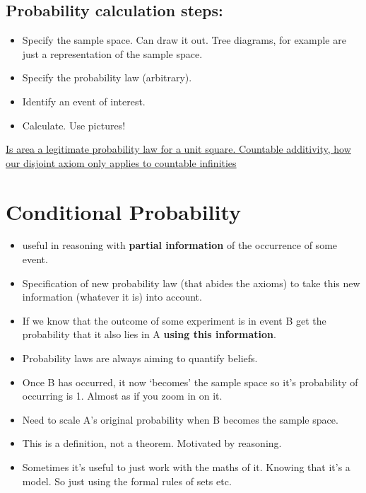 \documentclass[11pt]{article}
\begin{document}
\hypertarget{probability-calculation-steps}{%
\subsection{Probability calculation
steps:}\label{probability-calculation-steps}}

\begin{itemize}
\tightlist
\item
  Specify the sample space. Can draw it out. Tree diagrams, for example
  are just a representation of the sample space.
\item
  Specify the probability law (arbitrary).
\item
  Identify an event of interest.
\item
  Calculate. Use pictures!
\end{itemize}

\href{https://www.youtube.com/watch?v=mUxg3j_h5GM\&list=PLUl4u3cNGP60hI9ATjSFgLZpbNJ7myAg6\&index=9}{Is
area a legitimate probability law for a unit square. Countable
additivity, how our disjoint axiom only applies to countable infinities}

\hypertarget{conditional-probability}{%
\section{Conditional Probability}\label{conditional-probability}}

\begin{itemize}
\item
  useful in reasoning with \textbf{partial information} of the
  occurrence of some event.
\item
  Specification of new probability law (that abides the axioms) to take
  this new information (whatever it is) into account.
\item
  If we know that the outcome of some experiment is in event B get the
  probability that it also lies in A \textbf{using this information}.
\item
  Probability laws are always aiming to quantify beliefs.
\item
  Once B has occurred, it now `becomes' the sample space so it's
  probability of occurring is 1. Almost as if you zoom in on it.
\item
  Need to scale A's original probability when B becomes the sample
  space.
\item
  This is a definition, not a theorem. Motivated by reasoning.
\item
  Sometimes it's useful to just work with the maths of it. Knowing that
  it's a model. So just using the formal rules of sets etc.
\end{itemize}
\end{document}
